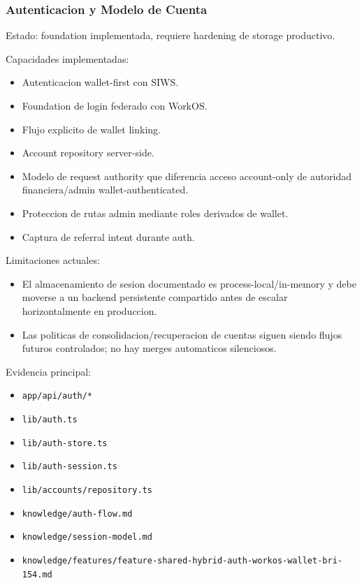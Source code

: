 \documentclass[
  10pt,
  letterpaper,
]{article}
\providecommand{\tightlist}{%
  \setlength{\itemsep}{0pt}\setlength{\parskip}{0pt}}
\let\oldtexttt\texttt
\renewcommand{\texttt}[1]{\oldtexttt{\small #1}}
\begin{document}
\subsubsection{Autenticacion y Modelo de
Cuenta}\label{autenticacion-y-modelo-de-cuenta}

Estado: foundation implementada, requiere hardening de storage
productivo.

Capacidades implementadas:

\begin{itemize}
\tightlist
\item
  Autenticacion wallet-first con SIWS.
\item
  Foundation de login federado con WorkOS.
\item
  Flujo explicito de wallet linking.
\item
  Account repository server-side.
\item
  Modelo de request authority que diferencia acceso account-only de
  autoridad financiera/admin wallet-authenticated.
\item
  Proteccion de rutas admin mediante roles derivados de wallet.
\item
  Captura de referral intent durante auth.
\end{itemize}

Limitaciones actuales:

\begin{itemize}
\tightlist
\item
  El almacenamiento de sesion documentado es process-local/in-memory y
  debe moverse a un backend persistente compartido antes de escalar
  horizontalmente en produccion.
\item
  Las politicas de consolidacion/recuperacion de cuentas siguen siendo
  flujos futuros controlados; no hay merges automaticos silenciosos.
\end{itemize}

Evidencia principal:

\begin{itemize}
\tightlist
\item
  \texttt{app/api/auth/*}
\item
  \texttt{lib/auth.ts}
\item
  \texttt{lib/auth-store.ts}
\item
  \texttt{lib/auth-session.ts}
\item
  \texttt{lib/accounts/repository.ts}
\item
  \texttt{knowledge/auth-flow.md}
\item
  \texttt{knowledge/session-model.md}
\item
  \texttt{knowledge/features/feature-shared-hybrid-auth-workos-wallet-bri-154.md}
\end{itemize}
\end{document}

